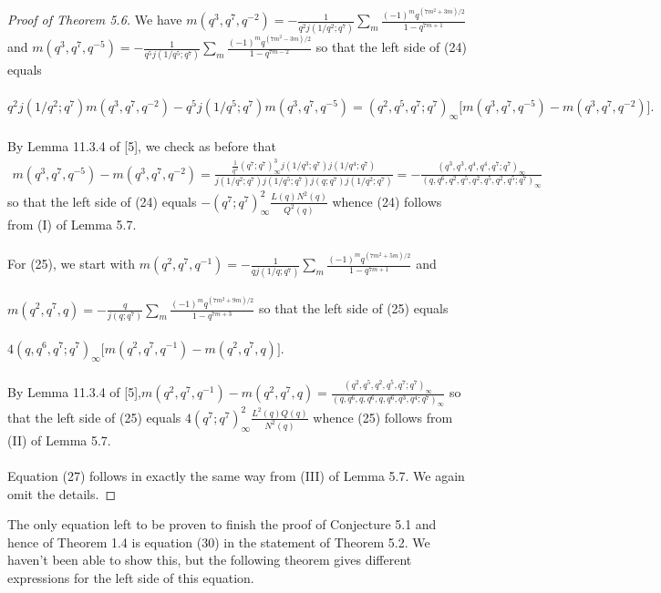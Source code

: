 \documentclass[10pt,reqno]{amsart}
\begin{document}
\begin{proof}[Proof of Theorem 5.6]
We have $m(q^3,q^7,q^{-2})=-\displaystyle\frac{1}{q^2j(1/q^2;q^7)}\displaystyle\sum_{m}\displaystyle\frac{(-1)^mq^{(7m^2+3m)/2}}{1-q^{7m+1}}$ and $m(q^3,q^7,q^{-5})=-\displaystyle\frac{1}{q^5j(1/q^5;q^7)}\displaystyle\sum_{m}\displaystyle\frac{(-1)^mq^{(7m^2-3m)/2}}{1-q^{7m-2}}$ so that the left side of (24) equals \\ \\
$q^2j(1/q^2;q^7)m(q^3,q^7,q^{-2})-q^5j(1/q^5;q^7)m(q^3,q^7,q^{-5})=(q^2,q^5,q^7;q^7)_{\infty}\Bigg[m(q^3,q^7,q^{-5})-m(q^3,q^7,q^{-2})\Bigg].$ \\ \\
By Lemma 11.3.4 of [5], we check as before that 
\begin{align*}
    m(q^3,q^7,q^{-5})-m(q^3,q^7,q^{-2})=\displaystyle\frac{\displaystyle\frac{1}{q^2}(q^7;q^7)_{\infty}^3j(1/q^3;q^7)j(1/q^4;q^7)}{j(1/q^2;q^7)j(1/q^5;q^7)j(q;q^7)j(1/q^2;q^7)}=-\displaystyle\frac{(q^3,q^3,q^4,q^4,q^7;q^7)_{\infty}}{(q,q^6,q^2,q^5,q^2,q^5,q^2,q^5;q^7)_{\infty}}
\end{align*}
so that the left side of (24) equals $-(q^7;q^7)_{\infty}^2\displaystyle\frac{L(q)N^2(q)}{Q^2(q)}$ whence (24) follows from (I) of Lemma 5.7. \\ \\
For (25), we start with $m(q^2,q^7,q^{-1})=-\displaystyle\frac{1}{qj(1/q;q^7)}\displaystyle\sum_{m}\displaystyle\frac{(-1)^mq^{(7m^2+5m)/2}}{1-q^{7m+1}}$ and \\ \\ $m(q^2,q^7,q)=-\displaystyle\frac{q}{j(q;q^7)}\displaystyle\sum_{m}\displaystyle\frac{(-1)^mq^{(7m^2+9m)/2}}{1-q^{7m+3}}$ so that the left side of (25) equals  \\ \\
$4(q,q^6,q^7;q^7)_{\infty}\Bigg[m(q^2,q^7,q^{-1})-m(q^2,q^7,q)\Bigg].$ \\ \\
By Lemma 11.3.4 of [5],$m(q^2,q^7,q^{-1})-m(q^2,q^7,q)=\displaystyle\frac{(q^2,q^5,q^2,q^5,q^7;q^7)_{\infty}}{(q,q^6,q,q^6,q,q^6,q^3,q^4;q^7)_{\infty}}$
so that the left side of (25) equals $4(q^7;q^7)_{\infty}^2\displaystyle\frac{L^2(q)Q(q)}{N^2(q)}$ whence (25) follows from (II) of Lemma 5.7. \\ \\
Equation (27) follows in exactly the same way from (III) of Lemma 5.7. We again omit the details. 

\end{proof} 
The only equation left to be proven to finish the proof of Conjecture 5.1 and hence of Theorem 1.4 is equation (30) in the statement of Theorem 5.2. We haven't been able to show this, but the following theorem gives different expressions for the left side of this equation. 
\end{document}
